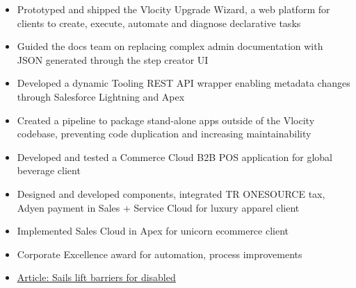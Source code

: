 \documentclass[10pt,a4paper,ragged2e]{altacv}
\begin{document}
\divider

\begin{itemize}
\item Prototyped and shipped the Vlocity Upgrade Wizard, a web platform for clients to create, execute, automate and diagnose declarative tasks
\item Guided the docs team on replacing complex admin documentation with JSON generated through the step creator UI
\item Developed a dynamic Tooling REST API wrapper enabling metadata changes through Salesforce Lightning and Apex
\item Created a pipeline to package stand-alone apps outside of the Vlocity codebase, preventing code duplication and increasing maintainability
\end{itemize}

\divider

\begin{itemize}
\item Developed and tested a Commerce Cloud B2B POS application for global beverage client
\item Designed and developed components, integrated TR ONESOURCE tax, Adyen payment in Sales + Service Cloud for luxury apparel client
\item Implemented Sales Cloud in Apex for unicorn ecommerce client
\end{itemize}

\divider

\begin{itemize}
\item Corporate Excellence award for automation, process improvements
\end{itemize}

\divider

\begin{itemize}
\item \underline{\href{https://www.thespec.com/living-story/4735122-video-sails-lift-barriers-for-disabled/}{Article: Sails lift barriers for disabled}}
\end{itemize}
\end{document}
